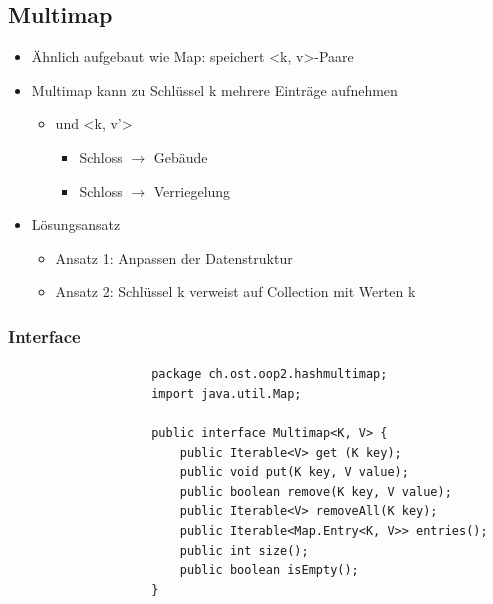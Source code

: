 \documentclass[a4paper, landscape, 8pt]{scrartcl}
\begin{document}
\begin{multicols*}{4}
            \subsection{Multimap}
                \begin{itemize}
                    \item Ähnlich aufgebaut wie Map: speichert <k, v>-Paare
                    \item Multimap kann zu Schlüssel k mehrere Einträge aufnehmen
                    \begin{itemize}
                        \item <k, v> und <k, v'>
                        \begin{itemize}
                            \item Schloss $\to$ Gebäude
                            \item Schloss $\to$ Verriegelung
                        \end{itemize}
                    \end{itemize}
                    \item Lösungsansatz
                    \begin{itemize}
                        \item Ansatz 1: Anpassen der Datenstruktur
                        \item Ansatz 2: Schlüssel k verweist auf Collection mit Werten k
                    \end{itemize}
                \end{itemize}

                \subsubsection{Interface}
                    \begin{lstlisting}
                    package ch.ost.oop2.hashmultimap;
                    import java.util.Map;

                    public interface Multimap<K, V> {
                        public Iterable<V> get (K key);
                        public void put(K key, V value);
                        public boolean remove(K key, V value);
                        public Iterable<V> removeAll(K key);
                        public Iterable<Map.Entry<K, V>> entries();
                        public int size();
                        public boolean isEmpty();
                    }
                    \end{lstlisting}

\end{multicols*}
\end{document}
